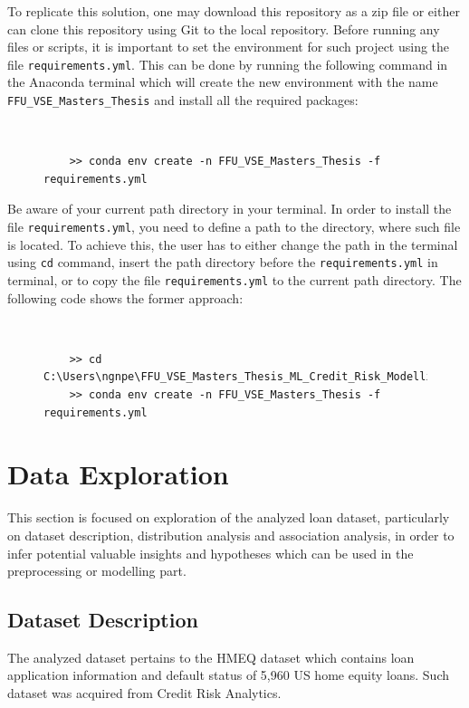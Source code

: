 To replicate this solution, one may download this repository as a zip file or either can clone this repository using Git to the local repository. Before running any files or scripts, it is important to set the environment for such project using the file \texttt{requirements.yml}. This can be done by running the following command in the Anaconda terminal which will create the new environment with the name \texttt{FFU\_VSE\_Masters\_Thesis} and install all the required packages:
\begin{figure}[H]
    \centering\
{\footnotesize
\begin{verbatim}
    >> conda env create -n FFU_VSE_Masters_Thesis -f requirements.yml    
\end{verbatim}
\vspace{-1em}
}
\end{figure}
Be aware of your current path directory in your terminal. In order to install the file \texttt{requirements.yml}, you need to define a path to the directory, where such file is located.
To achieve this, the user has to either change the path in the terminal using \texttt{cd} command, insert the path directory before the \texttt{requirements.yml} in terminal, or to copy the file \texttt{requirements.yml} to the current path directory. The following code shows the former approach:
\begin{figure}[H]
    \centering\
{\footnotesize
\begin{verbatim}
    >> cd C:\Users\ngnpe\FFU_VSE_Masters_Thesis_ML_Credit_Risk_Modelling
    >> conda env create -n FFU_VSE_Masters_Thesis -f requirements.yml   
\end{verbatim}
\vspace{-1em}
}
\end{figure}









\section{Data Exploration}
This section is focused on exploration of the analyzed loan dataset, particularly on dataset description, distribution analysis and association analysis, in order to infer potential valuable insights and hypotheses which can be used in the preprocessing or modelling part.

\subsection{Dataset Description}
The analyzed dataset pertains to the HMEQ dataset which contains loan application information and default status of 5,960 US home equity loans. Such dataset was acquired from Credit Risk Analytics.

